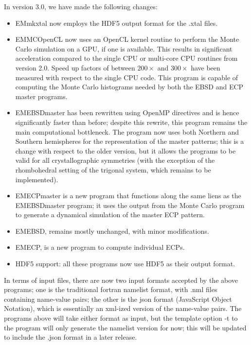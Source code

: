 \documentclass[DIV=calc, paper=letter, fontsize=11pt]{scrartcl}	 %
\begin{document}
In version 3.0, we have made the following changes:
\begin{itemize}
	\item \textsf{EMmkxtal} now employs the HDF5 output format for the .xtal files.
	\item \textsf{EMMCOpenCL} now uses an OpenCL kernel routine to perform the Monte Carlo simulation on a GPU, if one is available.  This results in significant acceleration compared to the single CPU or multi-core CPU routines from version 2.0.  Speed up factors of between $200\times$ and $300\times$ have been measured with respect to the single CPU code.  This program is capable of computing the Monte Carlo
	histograms needed by both the EBSD and ECP master programs.
	\item \textsf{EMEBSDmaster} has been rewritten using OpenMP directives and is hence significantly faster than before; despite this rewrite, this program 
	remains the main computational bottleneck.  The program now uses both Northern and Southern hemispheres for the representation of the master patterns; this is a change with respect to the older version, but it allows the programs to be valid for all crystallographic symmetries (with the exception of the rhombohedral setting of the trigonal system, which remains to be implemented).
	\item \textsf{EMECPmaster} is a new program that functions along the same liens as the \textsf{EMEBSDmaster} program; it uses the output from the Monte Carlo program
	to generate a dynamical simulation of the master ECP pattern.
	\item \textsf{EMEBSD}, remains mostly unchanged, with minor modifications.
	\item \textsf{EMECP}, is a new program to compute individual ECPs.
	\item HDF5 support: all these programs now use HDF5 as their output format.
\end{itemize}
In terms of input files, there are now two input formats accepted by the above programs; one is the traditional fortran namelist format, with .nml files containing name-value pairs;
the other is the json format (JavaScript Object Notation), which is essentially an xml-ized version of the name-value pairs.  The programs above will take either format as input, 
but the template option \textsf{-t} to the program will only generate the namelist version for now; this will be updated to include the \textsf{.json} format in a later release.

\newpage
\end{document}
